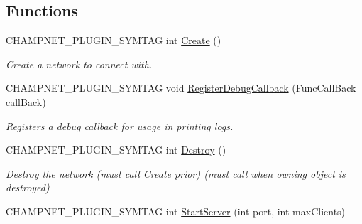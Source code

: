\subsection*{Functions}
\begin{DoxyCompactItemize}
\item 
\hypertarget{namespace_champ_net_plugin_a849f82c5f4de7d9a7cf5d56644a5ebf2}{C\-H\-A\-M\-P\-N\-E\-T\-\_\-\-P\-L\-U\-G\-I\-N\-\_\-\-S\-Y\-M\-T\-A\-G int \hyperlink{namespace_champ_net_plugin_a849f82c5f4de7d9a7cf5d56644a5ebf2}{Create} ()}\label{namespace_champ_net_plugin_a849f82c5f4de7d9a7cf5d56644a5ebf2}

\begin{DoxyCompactList}\small\item\em Create a network to connect with. \end{DoxyCompactList}\item 
\hypertarget{namespace_champ_net_plugin_a5a62b238f68c59b131074192f76a332f}{C\-H\-A\-M\-P\-N\-E\-T\-\_\-\-P\-L\-U\-G\-I\-N\-\_\-\-S\-Y\-M\-T\-A\-G void \hyperlink{namespace_champ_net_plugin_a5a62b238f68c59b131074192f76a332f}{Register\-Debug\-Callback} (Func\-Call\-Back call\-Back)}\label{namespace_champ_net_plugin_a5a62b238f68c59b131074192f76a332f}

\begin{DoxyCompactList}\small\item\em Registers a debug callback for usage in printing logs. \end{DoxyCompactList}\item 
\hypertarget{namespace_champ_net_plugin_a7380724b368807f88b5cbe3037a8a9d8}{C\-H\-A\-M\-P\-N\-E\-T\-\_\-\-P\-L\-U\-G\-I\-N\-\_\-\-S\-Y\-M\-T\-A\-G int \hyperlink{namespace_champ_net_plugin_a7380724b368807f88b5cbe3037a8a9d8}{Destroy} ()}\label{namespace_champ_net_plugin_a7380724b368807f88b5cbe3037a8a9d8}

\begin{DoxyCompactList}\small\item\em Destroy the network (must call Create prior) (must call when owning object is destroyed) \end{DoxyCompactList}\item 
\hypertarget{namespace_champ_net_plugin_a53b12084325aeaf2abd475f3b5d19627}{C\-H\-A\-M\-P\-N\-E\-T\-\_\-\-P\-L\-U\-G\-I\-N\-\_\-\-S\-Y\-M\-T\-A\-G int \hyperlink{namespace_champ_net_plugin_a53b12084325aeaf2abd475f3b5d19627}{Start\-Server} (int port, int max\-Clients)}\label{namespace_champ_net_plugin_a53b12084325aeaf2abd475f3b5d19627}


\end{DoxyCompactItemize}
